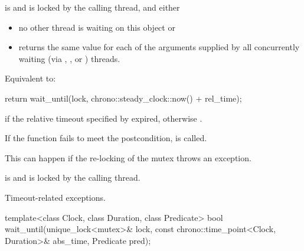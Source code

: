 \begin{itemdescr}
\pnum
\expects
{} is  and 
is locked by the calling thread, and either
\begin{itemize}
\item no other thread is waiting on this  object or
\item {} returns the same value for each of the  arguments
supplied by all concurrently waiting (via , , or
) threads.
\end{itemize}

\pnum
\effects
Equivalent to:
\begin{codeblock}
return wait_until(lock, chrono::steady_clock::now() + rel_time);
\end{codeblock}

\pnum
\returns
{} if
the relative timeout specified by  expired,
otherwise .

\pnum
\remarks
If the function fails to meet the postcondition, 
is called.
\begin{note}
This can happen if the re-locking of the mutex throws an exception.
\end{note}

\pnum
\ensures
{} is  and 
is locked by the calling thread.

\pnum
\throws
Timeout-related
exceptions.
\end{itemdescr}

%
\begin{itemdecl}
template<class Clock, class Duration, class Predicate>
  bool wait_until(unique_lock<mutex>& lock,
                  const chrono::time_point<Clock, Duration>& abs_time,
                  Predicate pred);
\end{itemdecl}

